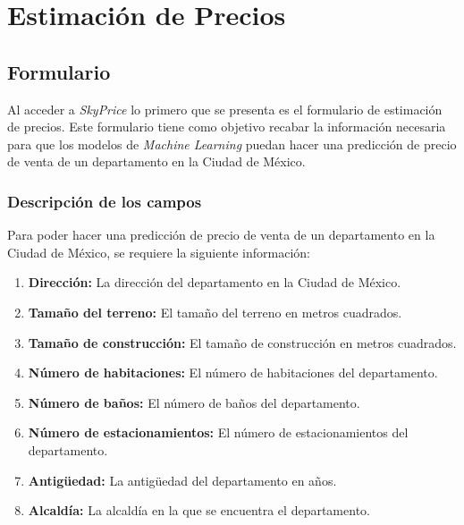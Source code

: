 \chapter{\textcolor{azulescom}{Estimación de Precios}}

\section{Formulario}
Al acceder a \textit{SkyPrice} lo primero que se presenta es el formulario de
estimación de precios. Este formulario tiene como objetivo recabar la información
necesaria para que los modelos de \textit{Machine Learning} puedan hacer una
predicción de precio de venta de un departamento en la Ciudad de México.

\subsection{Descripción de los campos}
Para poder hacer una predicción de precio de venta de un departamento en la Ciudad
de México, se requiere la siguiente información:

\begin{enumerate}
    \item \textbf{Dirección:} La dirección del departamento en la Ciudad de México.
    \item \textbf{Tamaño del terreno:} El tamaño del terreno en metros cuadrados.
    \item \textbf{Tamaño de construcción:} El tamaño de construcción en metros cuadrados.
    \item \textbf{Número de habitaciones:} El número de habitaciones del departamento.
    \item \textbf{Número de baños:} El número de baños del departamento.
    \item \textbf{Número de estacionamientos:} El número de estacionamientos del departamento.
    \item \textbf{Antigüedad:} La antigüedad del departamento en años.
    \item \textbf{Alcaldía:} La alcaldía en la que se encuentra el departamento.
\end{enumerate}

